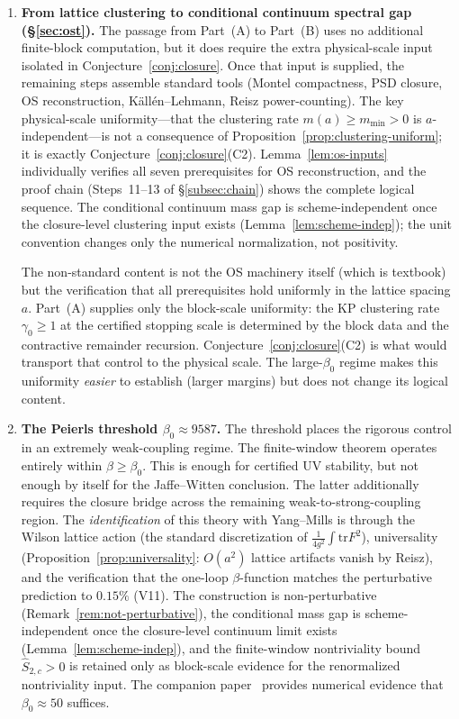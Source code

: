 \documentclass[11pt]{article}
\theoremstyle{definition}
\newcommand{\tr}{\mathrm{tr}}
\begin{document}
\begin{enumerate}[label=\textbf{(\arabic*)}]
\item \textbf{From lattice clustering to conditional continuum
spectral gap (\S\ref{sec:ost}).}
The passage from Part~(A) to Part~(B) uses no additional finite-block
computation, but it does require the extra physical-scale input isolated
in Conjecture~\ref{conj:closure}.  Once that input is supplied, the
remaining steps assemble standard tools (Montel compactness, PSD
closure, OS reconstruction, K\"all\'en--Lehmann, Reisz power-counting).
The key physical-scale uniformity---that the clustering rate $m(a)\ge m_{\min}>0$ is $a$-independent---is not a consequence of Proposition~\ref{prop:clustering-uniform}; it is exactly Conjecture~\ref{conj:closure}(C2).
Lemma~\ref{lem:os-inputs} individually verifies all
seven prerequisites for OS reconstruction,
and the proof chain (Steps~11--13 of
\S\ref{subsec:chain}) shows the complete logical
sequence.  The conditional continuum mass gap is scheme-independent once the closure-level clustering input exists (Lemma~\ref{lem:scheme-indep}); the unit convention changes only the numerical normalization, not positivity.

The non-standard content is not the OS machinery
itself (which is textbook) but the verification that
all prerequisites hold uniformly in the
lattice spacing $a$.  Part~(A) supplies only the block-scale uniformity: the KP clustering rate $\gamma_0\ge 1$ at the certified stopping scale is determined by the block data and the contractive remainder recursion.  Conjecture~\ref{conj:closure}(C2) is what would transport that control to the physical scale.  The large-$\beta_0$ regime makes this
uniformity \emph{easier} to establish (larger margins)
but does not change its logical content.

\item \textbf{The Peierls threshold $\beta_0\approx 9587$.}
The threshold places
the rigorous control in an extremely weak-coupling regime.
The finite-window theorem operates entirely within $\beta\ge\beta_0$.  This is enough for certified UV stability, but not enough by itself for the Jaffe--Witten conclusion.  The latter additionally requires the closure bridge across the remaining weak-to-strong-coupling region.
The \emph{identification} of this theory with
Yang--Mills is through the Wilson lattice action
(the standard discretization of $\frac{1}{4g^2}\int\tr F^2$),
universality (Proposition~\ref{prop:universality}:
$O(a^2)$ lattice artifacts vanish by Reisz), and
the verification that the one-loop $\beta$-function matches
the perturbative prediction to $0.15\%$ (V11).
The construction is non-perturbative
(Remark~\ref{rem:not-perturbative}), the conditional mass gap is scheme-independent once the closure-level continuum limit exists (Lemma~\ref{lem:scheme-indep}), and the finite-window nontriviality bound $\hat S_{2,c}>0$ is retained only as block-scale evidence for the renormalized nontriviality input.
The companion paper~\cite{companion} provides numerical
evidence that $\beta_0\approx 50$ suffices.


\end{enumerate}
\end{document}
